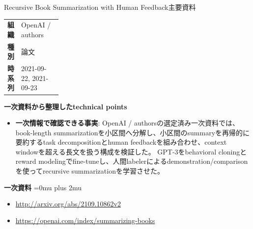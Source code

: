 \begin{technicalnote}{Recursive Book Summarization with Human Feedback}{主要資料}
\begingroup
\begin{tabularx}{\linewidth}{@{}>{\bfseries}p{0.22\linewidth}X@{}}
組織 & OpenAI / authors \\
種別 & 論文 \\
時系列 & 2021-09-22, 2021-09-23 \\
\end{tabularx}
\smallskip
\begin{minipage}{\linewidth}
{\bfseries 一次資料から整理したtechnical points}
\begin{itemize}[leftmargin=1.5em,itemsep=0.35em]
\item \textbf{一次情報で確認できる事実}: OpenAI / authorsの選定済み一次資料では、book-length summarizationを小区間へ分解し、小区間のsummaryを再帰的に要約するtask decompositionとhuman feedbackを組み合わせ、context windowを超える長文を扱う構成を検証した。 GPT-3をbehavioral cloningとreward modelingでfine-tuneし、人間labelerによるdemonstration/comparisonを使ってrecursive summarizationを学習させた。
\end{itemize}
\begin{minipage}{\linewidth}
\begin{samepage}
{\bfseries 一次資料}
\begingroup\sloppy
\Urlmuskip=0mu plus 2mu\relax
\begin{itemize}[leftmargin=1.5em,itemsep=0.25em]
\item {\scriptsize\url{http://arxiv.org/abs/2109.10862v2}}
\item {\scriptsize\url{https://openai.com/index/summarizing-books}}
\end{itemize}
\endgroup
\end{samepage}
\end{minipage}
\end{minipage}
\endgroup
\end{technicalnote}
\medskip

